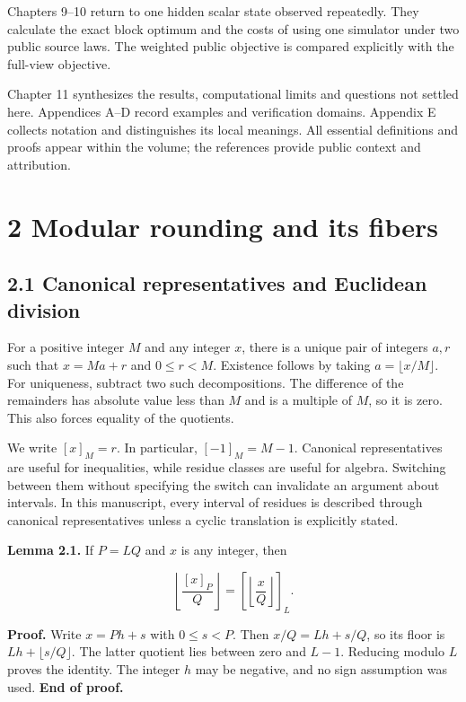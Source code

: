 \documentclass[
]{article}
\begin{document}
Chapters 9--10 return to one hidden scalar state observed repeatedly.
They calculate the exact block optimum and the costs of using one
simulator under two public source laws. The weighted public objective is
compared explicitly with the full-view objective.

Chapter 11 synthesizes the results, computational limits and questions
not settled here. Appendices A--D record examples and verification
domains. Appendix E collects notation and distinguishes its local
meanings. All essential definitions and proofs appear within the volume;
the references provide public context and attribution.

\section{2 Modular rounding and its
fibers}\label{modular-rounding-and-its-fibers}

\subsection{2.1 Canonical representatives and Euclidean
division}\label{canonical-representatives-and-euclidean-division}

For a positive integer \(M\) and any integer \(x\), there is a unique
pair of integers \(a,r\) such that \(x=Ma+r\) and \(0\le r<M\).
Existence follows by taking \(a=\lfloor x/M\rfloor\). For uniqueness,
subtract two such decompositions. The difference of the remainders has
absolute value less than \(M\) and is a multiple of \(M\), so it is
zero. This also forces equality of the quotients.

We write \([x]_M=r\). In particular, \([-1]_M=M-1\). Canonical
representatives are useful for inequalities, while residue classes are
useful for algebra. Switching between them without specifying the switch
can invalidate an argument about intervals. In this manuscript, every
interval of residues is described through canonical representatives
unless a cyclic translation is explicitly stated.

\textbf{Lemma 2.1.} If \(P=LQ\) and \(x\) is any integer, then

\[
\left\lfloor\frac{[x]_P}{Q}\right\rfloor
=\left[\left\lfloor\frac{x}{Q}\right\rfloor\right]_L.
\]

\textbf{Proof.} Write \(x=Ph+s\) with \(0\le s<P\). Then \(x/Q=Lh+s/Q\),
so its floor is \(Lh+\lfloor s/Q\rfloor\). The latter quotient lies
between zero and \(L-1\). Reducing modulo \(L\) proves the identity. The
integer \(h\) may be negative, and no sign assumption was used.
\textbf{End of proof.}
\end{document}
